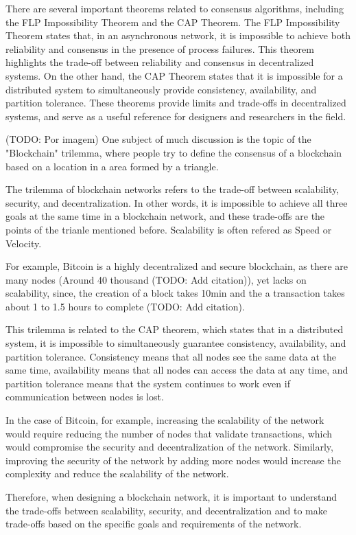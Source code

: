 There are several important theorems related to consensus algorithms, including the FLP Impossibility Theorem and the CAP Theorem. The FLP Impossibility Theorem states that, in an asynchronous network, it is impossible to achieve both reliability and consensus in the presence of process failures. This theorem highlights the trade-off between reliability and consensus in decentralized systems. On the other hand, the CAP Theorem states that it is impossible for a distributed system to simultaneously provide consistency, availability, and partition tolerance. These theorems provide limits and trade-offs in decentralized systems, and serve as a useful reference for designers and researchers in the field.


(TODO: Por imagem)
One subject of much discussion is the topic of the "Blockchain" trilemma, where people try to define the consensus of a blockchain based on a location in a area formed by a triangle.

The trilemma of blockchain networks refers to the trade-off between scalability, security, and decentralization. In other words, it is impossible to achieve all three goals at the same time in a blockchain network, and these trade-offs are the points of the trianle mentioned before. Scalability is often refered as Speed or Velocity.

For example, Bitcoin is a highly decentralized and secure blockchain, as there are many nodes (Around 40 thousand (TODO: Add citation)), yet lacks on scalability, since, the creation of a block takes 10min and the a transaction takes about 1 to 1.5 hours to complete (TODO: Add citation).

This trilemma is related to the CAP theorem, which states that in a distributed system, it is impossible to simultaneously guarantee consistency, availability, and partition tolerance. Consistency means that all nodes see the same data at the same time, availability means that all nodes can access the data at any time, and partition tolerance means that the system continues to work even if communication between nodes is lost.

In the case of Bitcoin, for example, increasing the scalability of the network would require reducing the number of nodes that validate transactions, which would compromise the security and decentralization of the network. Similarly, improving the security of the network by adding more nodes would increase the complexity and reduce the scalability of the network.

Therefore, when designing a blockchain network, it is important to understand the trade-offs between scalability, security, and decentralization and to make trade-offs based on the specific goals and requirements of the network.

